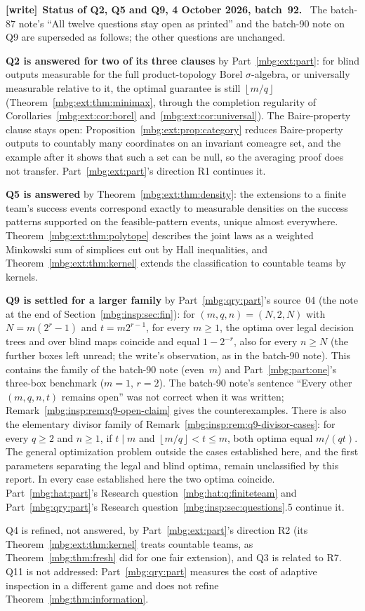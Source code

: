 \documentclass[11pt,letterpaper]{article}
\theoremstyle{definition}
\newcommand{\floor}[1]{\left\lfloor #1\right\rfloor}
\newenvironment{writenote}[1][]{\par\smallskip\begingroup\small
 \noindent\textbf{[write]}\if\relax\detokenize{#1}\relax\else~\textbf{#1.}\fi\ }%
 {\par\endgroup\smallskip}
\begin{document}
\begin{writenote}[Status of Q2, Q5 and Q9, 4 October 2026, batch~92]
The batch-87 note's ``All twelve questions stay open as printed'' and the batch-90 note on Q9 are superseded as follows; the other questions are unchanged.

\textbf{Q2 is answered for two of its three clauses} by Part~\ref{mbg:ext:part}: for blind outputs measurable for the full product-topology Borel $\sigma$-algebra, or universally measurable relative to it, the optimal guarantee is still $\floor{m/q}$ (Theorem~\ref{mbg:ext:thm:minimax}, through the completion regularity of Corollaries~\ref{mbg:ext:cor:borel} and~\ref{mbg:ext:cor:universal}). The Baire-property clause stays open: Proposition~\ref{mbg:ext:prop:category} reduces Baire-property outputs to countably many coordinates on an invariant comeagre set, and the example after it shows that such a set can be null, so the averaging proof does not transfer. Part~\ref{mbg:ext:part}'s direction R1 continues it.

\textbf{Q5 is answered} by Theorem~\ref{mbg:ext:thm:density}: the extensions to a finite team's success events correspond exactly to measurable densities on the success patterns supported on the feasible-pattern events, unique almost everywhere. Theorem~\ref{mbg:ext:thm:polytope} describes the joint laws as a weighted Minkowski sum of simplices cut out by Hall inequalities, and Theorem~\ref{mbg:ext:thm:kernel} extends the classification to countable teams by kernels.

\textbf{Q9 is settled for a larger family} by Part~\ref{mbg:qry:part}'s source~04 (the note at the end of Section~\ref{mbg:insp:sec:fin}): for $(m,q,n)=(N,2,N)$ with $N=m(2^r-1)$ and $t=m2^{r-1}$, for every $m\ge1$, the optima over legal decision trees and over blind maps coincide and equal $1-2^{-r}$, also for every $n\ge N$ (the further boxes left unread; the write's observation, as in the batch-90 note). This contains the family of the batch-90 note (even~$m$) and Part~\ref{mbg:part:one}'s three-box benchmark ($m=1$, $r=2$). The batch-90 note's sentence ``Every other $(m,q,n,t)$ remains open'' was not correct when it was written; Remark~\ref{mbg:insp:rem:q9-open-claim} gives the counterexamples. There is also the elementary divisor family of Remark~\ref{mbg:insp:rem:q9-divisor-cases}: for every $q\ge2$ and $n\ge1$, if $t\mid m$ and $\floor{m/q}<t\le m$, both optima equal $m/(qt)$. The general optimization problem outside the cases established here, and the first parameters separating the legal and blind optima, remain unclassified by this report. In every case established here the two optima coincide. Part~\ref{mbg:hat:part}'s Research question~\ref{mbg:hat:q:finiteteam} and Part~\ref{mbg:qry:part}'s Research question~\ref{mbg:insp:sec:questions}.5 continue it.

Q4 is refined, not answered, by Part~\ref{mbg:ext:part}'s direction R2 (its Theorem~\ref{mbg:ext:thm:kernel} treats countable teams, as Theorem~\ref{mbg:thm:fresh} did for one fair extension), and Q3 is related to R7. Q11 is not addressed: Part~\ref{mbg:qry:part} measures the cost of adaptive inspection in a different game and does not refine Theorem~\ref{mbg:thm:information}.
\end{writenote}
\end{document}
